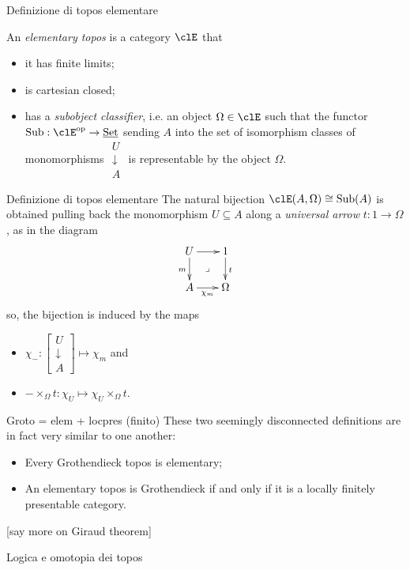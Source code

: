 \documentclass[presentation]{beamer}
\begin{document}
\begin{frame}[label={sec:org6a1b958}]{Definizione di topos elementare}
	\begin{block}{}
		An \emph{elementary topos} is a category $\clE$ that
		\begin{itemize}
			\item it has finite limits;%
			\item is cartesian closed;%
			\item has a \emph{subobject classifier}, i.e. an object $\Omega\in\clE$ such that the functor $\text{Sub} : \clE^\op\to \Set$ sending $A$ into the set of isomorphism classes of monomorphisms $\begin{smallmatrix}{U}\\\downarrow\\{A}\end{smallmatrix}$ is representable by the object $\Omega$.
		\end{itemize}
	\end{block}
\end{frame}
\begin{frame}{Definizione di topos elementare}
	The natural bijection $\clE(A,\Omega)\cong\text{Sub}(A)$ is obtained pulling back the monomorphism $U\subseteq A$ along a \emph{universal arrow} $t : 1\to \Omega$, as in the diagram
	\[
		\vcenter{\xymatrix@!=3mm{
		U \ar@{}[dr]|\lrcorner \ar[r]\ar[d]_m & 1\ar[d]^t \\
		A \ar[r]_{\chi_m}& \Omega
		}}
	\]
	so, the bijection is induced by the maps
	\begin{itemize}
		\item $\chi_{-} : \left[\begin{smallmatrix}
					      U \\ \downarrow \\ A
				      \end{smallmatrix} \right]\mapsto \chi_m$ and
		\item $-\times_\Omega t : \chi_U \mapsto \chi_U \times_\Omega t$.
	\end{itemize}
\end{frame}
\begin{frame}[label={sec:orgb2a88e9}]{Groto = elem + locpres (finito)}
  These two seemingly disconnected definitions are in fact very similar to one another:
  \begin{itemize}
    \item Every Grothendieck topos is elementary;
    \item An elementary topos is Grothendieck if and only if it is a locally finitely presentable category.
  \end{itemize}
  [say more on Giraud theorem]
\end{frame}
\begin{frame}[label={sec:org0dca741}]{Logica e omotopia dei topos}
\end{frame}
\end{document}
